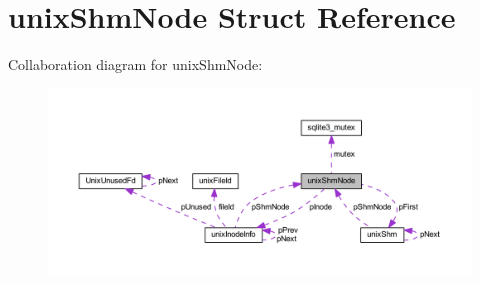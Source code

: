 \hypertarget{structunix_shm_node}{\section{unix\-Shm\-Node Struct Reference}
\label{structunix_shm_node}
}


Collaboration diagram for unix\-Shm\-Node\-:\nopagebreak
\begin{figure}[H]
\begin{center}
\leavevmode
\includegraphics[width=350pt]{structunix_shm_node__coll__graph}
\end{center}
\end{figure}
